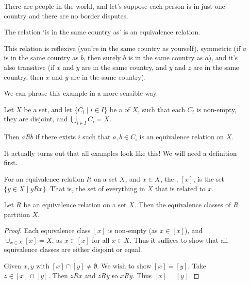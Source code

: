 \documentclass[a4paper]{scrartcl}
\begin{document}
\begin{example}
\begin{center}
\begin{tikzpicture}[x=0.75pt,y=0.75pt,yscale=-1,xscale=1]
\end{tikzpicture}

	\end{center}

	There are people in the world, and let's suppose each person is in just one country and there are no border disputes.

	The relation `is in the same country as' is an equivalence relation. 
	
	This relation is reflexive (you're in the same country as yourself), symmetric (if $a$ is in the same country as $b$, then surely $b$ is in the same country as $a$), and it's also transitive (if $x$ and $y$ are in the same country, and $y$ and $z$ are in the same country, then $x$ and $y$ are in the same country).
\end{example}


We can phrase this example in a more sensible way.

\begin{example}
	Let $X$ be a set, and let $\{C_i \mid i \in I \}$ be a  of $X$, such that each $C_i$ is non-empty, they are disjoint, and $\bigcup_{i \in I} C_i = X$.

	Then $a R b$ if there exists $i$ such that $a, b \in C_i$ is an equivalence relation on $X$.
\end{example}

It actually turns out that all examples look like this! We will need a definition first.

\begin{definition}
	For an equivalence relation $R$ on a set $X$, and $x \in X$, the , $[x]$, is the set $\{y \in X \mid y R x \}$. That is, the set of everything in $X$ that is related to $x$.
\end{definition}

\begin{proposition}
	Let $R$ be an equivalence relation on a set $X$. Then the equivalence classes of $R$ partition $X$.
\end{proposition}
\begin{proof}
	Each equivalence class $[x]$ is non-empty (as $x \in [x]$), and $\cup_{x \in X} [x] = X$, as $x \in [x]$ for all $x \in X$. Thus it suffices to show that all equivalence classes are either disjoint or equal.

	Given $x, y$ with $[x] \cap [y] \neq \emptyset$. We wish to show $[x] = [y]$. Take $z \in [x] \cap [y]$. Then $z R x$ and $z R y$ so $x R y$. Thus $[x] = [y]$.
\end{proof}
\end{document}
